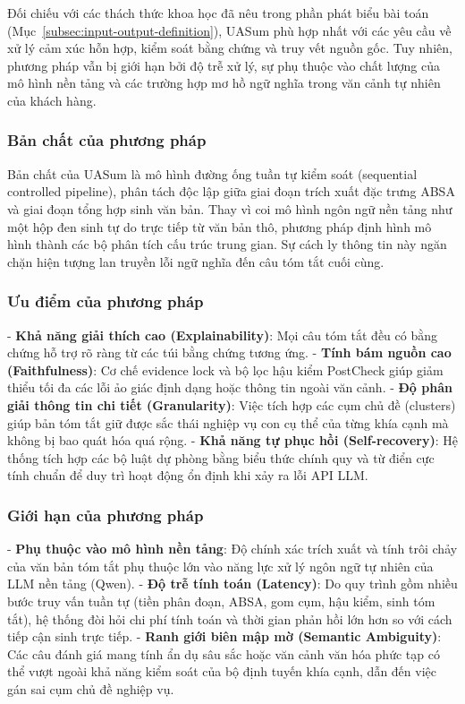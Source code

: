 Đối chiếu với các thách thức khoa học đã nêu trong phần phát biểu bài toán (Mục~\ref{subsec:input-output-definition}), UASum phù hợp nhất với các yêu cầu về xử lý cảm xúc hỗn hợp, kiểm soát bằng chứng và truy vết nguồn gốc. Tuy nhiên, phương pháp vẫn bị giới hạn bởi độ trễ xử lý, sự phụ thuộc vào chất lượng của mô hình nền tảng và các trường hợp mơ hồ ngữ nghĩa trong văn cảnh tự nhiên của khách hàng.

\subsubsection{Bản chất của phương pháp}
\label{subsubsec:method1-nature-of-method}

Bản chất của UASum là mô hình đường ống tuần tự kiểm soát (sequential controlled pipeline), phân tách độc lập giữa giai đoạn trích xuất đặc trưng ABSA và giai đoạn tổng hợp sinh văn bản. Thay vì coi mô hình ngôn ngữ nền tảng như một hộp đen sinh tự do trực tiếp từ văn bản thô, phương pháp định hình mô hình thành các bộ phân tích cấu trúc trung gian. Sự cách ly thông tin này ngăn chặn hiện tượng lan truyền lỗi ngữ nghĩa đến câu tóm tắt cuối cùng.

\subsubsection{Ưu điểm của phương pháp}
\label{subsubsec:method1-advantages-of-method}

- \textbf{Khả năng giải thích cao (Explainability)}: Mọi câu tóm tắt đều có bằng chứng hỗ trợ rõ ràng từ các túi bằng chứng tương ứng.
- \textbf{Tính bám nguồn cao (Faithfulness)}: Cơ chế evidence lock và bộ lọc hậu kiểm PostCheck giúp giảm thiểu tối đa các lỗi ảo giác định dạng hoặc thông tin ngoài văn cảnh.
- \textbf{Độ phân giải thông tin chi tiết (Granularity)}: Việc tích hợp các cụm chủ đề (clusters) giúp bản tóm tắt giữ được sắc thái nghiệp vụ con cụ thể của từng khía cạnh mà không bị bao quát hóa quá rộng.
- \textbf{Khả năng tự phục hồi (Self-recovery)}: Hệ thống tích hợp các bộ luật dự phòng bằng biểu thức chính quy và từ điển cực tính chuẩn để duy trì hoạt động ổn định khi xảy ra lỗi API LLM.

\subsubsection{Giới hạn của phương pháp}
\label{subsubsec:method1-limitations-of-method}

- \textbf{Phụ thuộc vào mô hình nền tảng}: Độ chính xác trích xuất và tính trôi chảy của văn bản tóm tắt phụ thuộc lớn vào năng lực xử lý ngôn ngữ tự nhiên của LLM nền tảng (Qwen).
- \textbf{Độ trễ tính toán (Latency)}: Do quy trình gồm nhiều bước truy vấn tuần tự (tiền phân đoạn, ABSA, gom cụm, hậu kiểm, sinh tóm tắt), hệ thống đòi hỏi chi phí tính toán và thời gian phản hồi lớn hơn so với cách tiếp cận sinh trực tiếp.
- \textbf{Ranh giới biên mập mờ (Semantic Ambiguity)}: Các câu đánh giá mang tính ẩn dụ sâu sắc hoặc văn cảnh văn hóa phức tạp có thể vượt ngoài khả năng kiểm soát của bộ định tuyến khía cạnh, dẫn đến việc gán sai cụm chủ đề nghiệp vụ.

